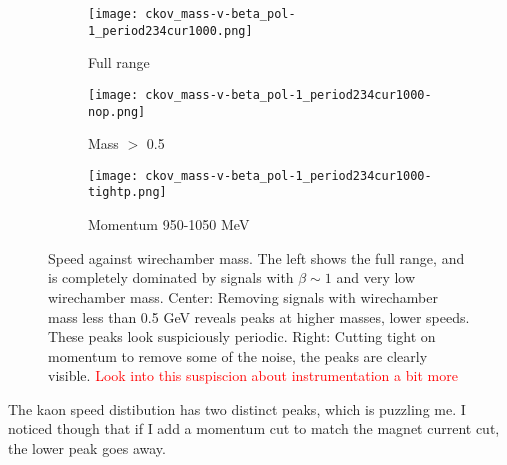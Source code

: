    \begin{figure}[h]	
 \centering   
               \begin{subfigure}[b]{0.3\textwidth}
            \centering
            \texttt{[image: ckov\_mass-v-beta\_pol-1\_period234cur1000.png]}
            \caption{Full range}
            \end{subfigure}
             \hfill   
            \begin{subfigure}[b]{0.3\textwidth}
            \centering
            \texttt{[image: ckov\_mass-v-beta\_pol-1\_period234cur1000-nop.png]}
            \caption{Mass $>$ 0.5}
            \end{subfigure}
             \hfill   
            \begin{subfigure}[b]{0.3\textwidth}
            \centering
            \texttt{[image: ckov\_mass-v-beta\_pol-1\_period234cur1000-tightp.png]}
            \caption{Momentum 950-1050 MeV}
            \end{subfigure}
  

            
\caption{Speed against wirechamber mass. The left shows the full range, and is completely dominated by signals with $\beta\sim 1$ and very low wirechamber mass. Center: Removing signals with wirechamber mass less than 0.5 GeV reveals peaks at higher masses, lower speeds. These peaks look suspiciously periodic. Right: Cutting tight on momentum to remove some of the noise, the peaks are clearly visible. \textcolor{red}{Look into this suspiscion about instrumentation a bit more} }
\label{fig_beta-mass-ckov}
  \end{figure}
  
  
  The kaon speed distibution has two distinct peaks, which is puzzling me.  I noticed though that if I add a momentum cut to match the magnet current cut, the lower peak goes away.
  
